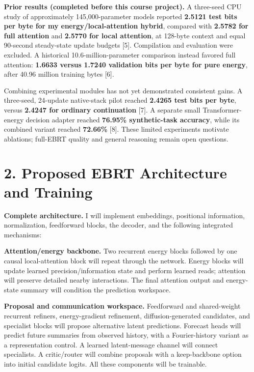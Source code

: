 \documentclass[11pt,letterpaper]{article}
\begin{document}
\textbf{Prior results (completed before this course project).} A three-seed CPU study of approximately 145,000-parameter models reported \textbf{2.5121 test bits per byte for my energy/local-attention hybrid}, compared with \textbf{2.5782 for full attention} and \textbf{2.5770 for local attention}, at 128-byte context and equal 90-second steady-state update budgets [5]. Compilation and evaluation were excluded. A historical 10.6-million-parameter comparison instead favored full attention: \textbf{1.6633 versus 1.7240 validation bits per byte for pure energy}, after 40.96 million training bytes [6].

Combining experimental modules has not yet demonstrated consistent gains. A three-seed, 24-update native-stack pilot reached \textbf{2.4265 test bits per byte}, versus \textbf{2.4247 for ordinary continuation} [7]. A separate small Transformer-energy decision adapter reached \textbf{76.95\% synthetic-task accuracy}, while its combined variant reached \textbf{72.66\%} [8]. These limited experiments motivate ablations; full-EBRT quality and general reasoning remain open questions.

\newpage
\section*{2. Proposed EBRT Architecture and Training}

\textbf{Complete architecture.} I will implement embeddings, positional information, normalization, feedforward blocks, the decoder, and the following integrated mechanisms:

\textbf{Attention/energy backbone.} Two recurrent energy blocks followed by one causal local-attention block will repeat through the network. Energy blocks will update learned precision/information state and perform learned reads; attention will preserve detailed nearby interactions. The final attention output and energy-state summary will condition the prediction workspace.

\textbf{Proposal and communication workspace.} Feedforward and shared-weight recurrent refiners, energy-gradient refinement, diffusion-generated candidates, and specialist blocks will propose alternative latent predictions. Forecast heads will predict future summaries from observed history, with a Fourier-history variant as a representation control. A learned latent-message channel will connect specialists. A critic/router will combine proposals with a keep-backbone option into initial candidate logits. All these components will be trainable.
\end{document}
